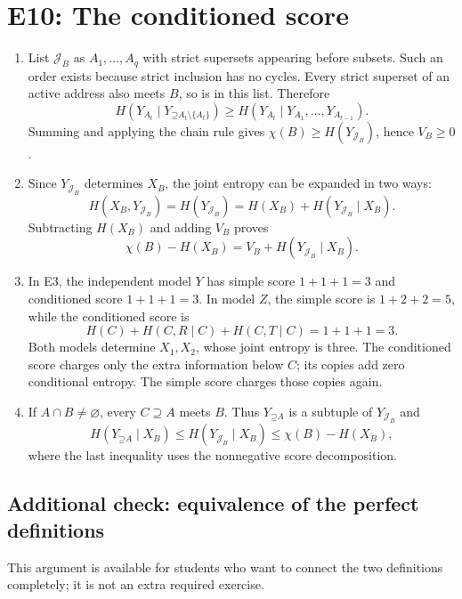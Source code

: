 \documentclass[11pt]{article}
\newcommand{\Up}{\mathord{\supseteq}}
\begin{document}
\section{E10: The conditioned score}
\label{sec:e10}
\begin{enumerate}[label=(\alph*)]
\item List $\mathcal{J}_B$ as $A_1,\ldots,A_q$ with strict supersets appearing
before subsets. Such an order exists because strict inclusion has no cycles.
Every strict superset of an active address also meets $B$, so is in this list.
Therefore
\[
 H(Y_{A_t}\mid Y_{\Up A_t\setminus\{A_t\}})
 \ge H(Y_{A_t}\mid Y_{A_1},\ldots,Y_{A_{t-1}}).
\]
Summing and applying the chain rule gives
$\chi(B)\ge H(Y_{\mathcal{J}_B})$, hence $V_B\ge0$.
\item Since $Y_{\mathcal{J}_B}$ determines $X_B$, the joint entropy can be
expanded in two ways:
\[
 H(X_B,Y_{\mathcal{J}_B})=H(Y_{\mathcal{J}_B})
 =H(X_B)+H(Y_{\mathcal{J}_B}\mid X_B).
\]
Subtracting $H(X_B)$ and adding $V_B$ proves
\[
 \chi(B)-H(X_B)=V_B+H(Y_{\mathcal{J}_B}\mid X_B).
\]
\item In E3, the independent model $Y$ has simple score $1+1+1=3$ and
conditioned score $1+1+1=3$. In model $Z$, the simple score is $1+2+2=5$,
while the conditioned score is
\[
 H(C)+H(C,R\mid C)+H(C,T\mid C)=1+1+1=3.
\]
Both models determine $X_1,X_2$, whose joint entropy is three. The conditioned
score charges only the extra information below $C$; its copies add zero
conditional entropy. The simple score charges those copies again.
\item If $A\cap B\ne\varnothing$, every $C\supseteq A$ meets $B$.
Thus $Y_{\Up A}$ is a subtuple of $Y_{\mathcal{J}_B}$ and
\[
 H(Y_{\Up A}\mid X_B)
 \le H(Y_{\mathcal{J}_B}\mid X_B)
 \le\chi(B)-H(X_B),
\]
where the last inequality uses the nonnegative score decomposition.
\end{enumerate}

\subsection{Additional check: equivalence of the perfect definitions}
This argument is available for students who want to connect the two definitions
completely; it is not an extra required exercise.
\end{document}

